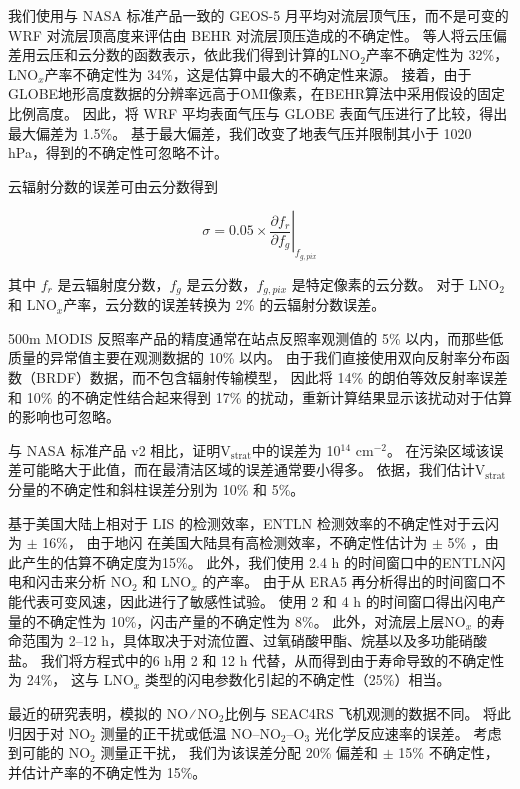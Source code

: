 我们使用与 NASA 标准产品一致的 GEOS-5 月平均对流层顶气压，而不是可变的 WRF 对流层顶高度来评估由 BEHR 对流层顶压造成的不确定性。
\citet{Acarreta.2004}等人将云压偏差用云压和云分数的函数表示，依此我们得到计算的LNO$_2$产率不确定性为 32\%，
LNO$_x$产率不确定性为 34\%，这是估算中最大的不确定性来源。
接着，由于GLOBE地形高度数据的分辨率远高于OMI像素，在BEHR算法中采用假设的固定比例高度。
因此，\citet{Laughner.2019a}将 WRF 平均表面气压与 GLOBE 表面气压进行了比较，得出最大偏差为 1.5\%。
基于最大偏差，我们改变了地表气压并限制其小于 1020 hPa，得到的不确定性可忽略不计。

云辐射分数的误差可由云分数得到

\begin{equation}
\sigma = 0.05 \times \left.\frac{\partial{f_r}}{\partial{f_g}}\right|_{f_{g,pix}}
\end{equation}

其中 $f_r$ 是云辐射度分数，$f_g$ 是云分数，$f_{g,pix}$ 是特定像素的云分数。
对于 LNO$_2$ 和 LNO$_x$产率，云分数的误差转换为 2\% 的云辐射分数误差。

500m MODIS 反照率产品的精度通常在站点反照率观测值的 5\% 以内，而那些低质量的异常值主要在观测数据的 10\% 以内\citep{Schaaf.2011}。
由于我们直接使用双向反射率分布函数（BRDF）数据，而不包含辐射传输模型，
因此将 14\% 的朗伯等效反射率误差和 10\% 的不确定性结合起来得到 17\% 的扰动\citep{Laughner.2019a}，重新计算结果显示该扰动对于估算的影响也可忽略。

与 NASA 标准产品 v2 相比，\citet{Krotkov.2017}证明V$_\textrm{strat}$中的误差为 10$^{14}$ cm$^{-2}$。
在污染区域该误差可能略大于此值，而在最清洁区域的误差通常要小得多\citep{Bucsela.2013}。
依据\citet{Allen.2019}，我们估计V$_\textrm{strat}$分量的不确定性和斜柱误差分别为 10\% 和 5\%。

基于美国大陆上相对于 LIS 的检测效率，ENTLN 检测效率的不确定性对于云闪为 $\pm$ 16\%，
由于地闪 在美国大陆具有高检测效率，不确定性估计为 $\pm$ 5\% \citep{Lapierre.2020}，由此产生的估算不确定度为15\%。
此外，我们使用 2.4 h 的时间窗口中的ENTLN闪电和闪击来分析 NO$_2$ 和 LNO$_x$ 的产率。
由于从 ERA5 再分析得出的时间窗口不能代表可变风速，因此进行了敏感性试验。
使用 2 和 4 h 的时间窗口得出闪电产量的不确定性为 10\%，闪击产量的不确定性为 8\%。
此外，对流层上层NO$_x$ 的寿命范围为 2--12 h，具体取决于对流位置、过氧硝酸甲酯、烷基以及多功能硝酸盐\citep{Nault.2017}。
我们将方程式中的6 h用 2 和 12 h 代替，从而得到由于寿命导致的不确定性为 24\%，
这与 LNO$_x$ 类型的闪电参数化引起的不确定性（25\%）相当。

最近的研究表明，模拟的 NO ∕ NO$_2$比例与 SEAC4RS 飞机观测的数据不同\citep{Travis.2016,Silvern.2018}。
\citet{Silvern.2018}将此归因于对 NO$_2$ 测量的正干扰或低温 NO--NO$_2$--O$_3$ 光化学反应速率的误差。
考虑到可能的 NO$_2$ 测量正干扰\citep{Allen.2019,Bucsela.2019}，
我们为该误差分配 20\% 偏差和 $\pm$ 15\% 不确定性，并估计产率的不确定性为 15\%。

